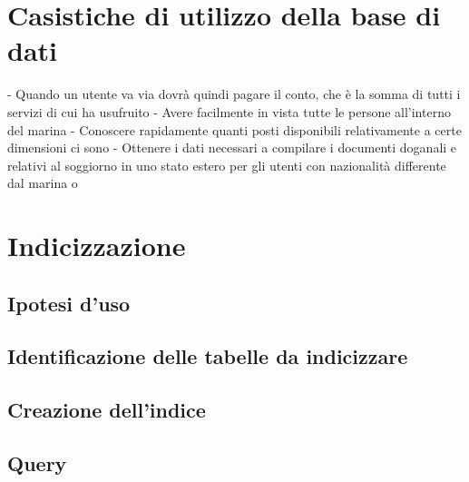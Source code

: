 \section{Casistiche di utilizzo della base di dati}

-	Quando un utente va via dovrà quindi pagare il conto, che è la somma di tutti i servizi di cui ha usufruito
-	Avere facilmente in vista tutte le persone all’interno del marina
-	Conoscere rapidamente quanti posti disponibili relativamente a certe dimensioni ci sono
-	Ottenere i dati necessari a compilare i documenti doganali e relativi al soggiorno in uno stato estero per gli utenti con nazionalità differente dal marina
o
\section{Indicizzazione}
\subsection{Ipotesi d'uso}
\subsection{Identificazione delle tabelle da indicizzare}
\subsection{Creazione dell'indice}
\subsection{Query}